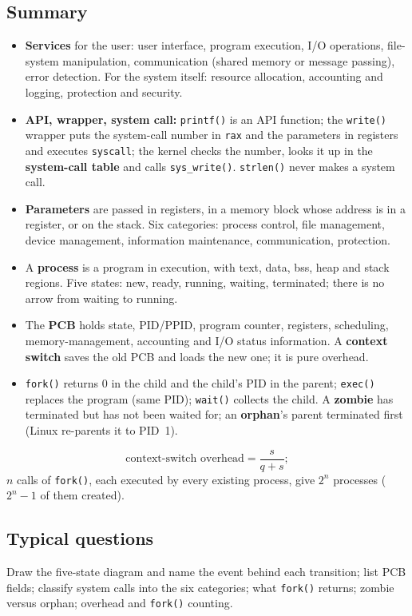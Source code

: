 \documentclass[11pt,a4paper]{article}
\newcommand{\term}[1]{\textbf{\color{mintdeep}#1}}
\newcommand{\cmd}[1]{\texttt{#1}}
\begin{document}
\subsection*{Summary}
\begin{itemize}
  \item \textbf{Services} for the user: user interface, program execution, I/O operations, file-system manipulation, communication (shared memory or message passing), error detection. For the system itself: resource allocation, accounting and logging, protection and security.
  \item \textbf{API, wrapper, system call:} \cmd{printf()} is an API function; the \cmd{write()} wrapper puts the system-call number in \texttt{rax} and the parameters in registers and executes \texttt{syscall}; the kernel checks the number, looks it up in the \term{system-call table} and calls \cmd{sys\_write()}. \cmd{strlen()} never makes a system call.
  \item \textbf{Parameters} are passed in registers, in a memory block whose address is in a register, or on the stack. Six categories: process control, file management, device management, information maintenance, communication, protection.
  \item A \term{process} is a program in execution, with text, data, bss, heap and stack regions. Five states: new, ready, running, waiting, terminated; there is no arrow from waiting to running.
  \item The \term{PCB} holds state, PID/PPID, program counter, registers, scheduling, memory-management, accounting and I/O status information. A \term{context switch} saves the old PCB and loads the new one; it is pure overhead.
  \item \cmd{fork()} returns $0$ in the child and the child's PID in the parent; \cmd{exec()} replaces the program (same PID); \cmd{wait()} collects the child. A \term{zombie} has terminated but has not been waited for; an \term{orphan}'s parent terminated first (Linux re-parents it to PID~1).
\end{itemize}

\begin{keyidea}
\[
\text{context-switch overhead} = \frac{s}{q+s};
\]
$n$ calls of \cmd{fork()}, each executed by every existing process, give $2^{n}$ processes ($2^{n}-1$ of them created).
\end{keyidea}

\subsection*{Typical questions}
Draw the five-state diagram and name the event behind each transition; list PCB fields; classify system calls into the six categories; what \cmd{fork()} returns; zombie versus orphan; overhead and \cmd{fork()} counting.
\end{document}
